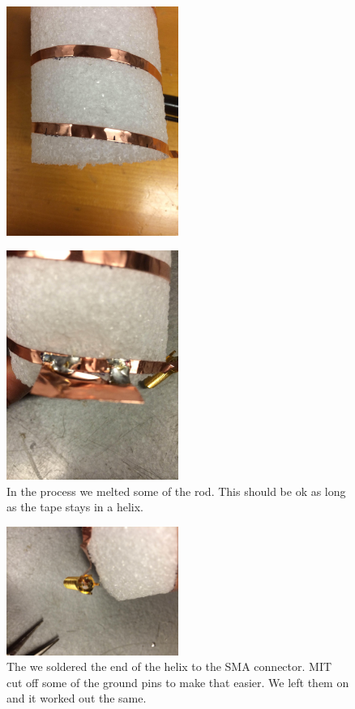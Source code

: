 \documentclass[11pt]{article} %
\begin{document}
\begin{figure}
  \centering
  \caption{   }
  \includegraphics[width=0.50\textwidth]{feed/12.jpeg}
\end{figure}


\begin{figure}
  \centering
  \caption{ In the process we melted some of the rod. This should be ok as long as the tape stays in a helix.   }
  \includegraphics[width=0.50\textwidth]{feed/13.jpeg}
\end{figure}



\begin{figure}
  \centering
  \caption{ The we soldered the end of the helix to the SMA connector. MIT cut off some of the ground pins to make that easier. We left them on and it worked out the same.   }
  \includegraphics[width=0.50\textwidth]{feed/14.jpeg}
\end{figure}
\end{document}
